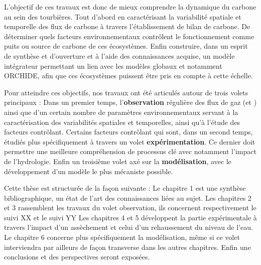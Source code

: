 \begin{linenumbers}

L'objectif de ces travaux est donc de mieux comprendre la dynamique du carbone au sein des tourbières.
Tout d'abord en caractérisant la variabilité spatiale et temporelle des flux de carbone à travers l'établissement de bilan de carbone.
De déterminer quels facteurs environnementaux contrôlent le fonctionnement comme puits ou source de carbone de ces écosystèmes.
Enfin construire, dans un esprit de synthèse et d'ouverture et à l'aide des connaissances acquise, un modèle intégrateur permettant un lien avec les modèles globaux et notamment ORCHIDE, afin que ces écosystèmes puissent être pris en compte à cette échelle.

Pour atteindre ces objectifs, nos travaux ont été articulés autour de trois volets  principaux :
Dans un premier temps, l'\textbf{observation} régulière des flux de gaz (\COO et \CHH) ainsi que d'un certain nombre de paramètres environnementaux servant à la caractérisation des variabilités spatiales et temporelles, ainsi qu'à l'étude des facteurs contrôlant.
Certains facteurs contrôlant qui sont, dans un second temps, étudiés plus spécifiquement à travers un volet \textbf{expérimentation}.
Ce dernier doit permettre une meilleure compréhension de processus clé avec notamment l'impact de l'hydrologie.
Enfin un troisième volet axé sur la \textbf{modélisation}, avec le développement d'un modèle le plus mécaniste possible.


Cette thèse est structurée de la façon suivante :
Le chapitre 1 est une synthèse bibliographique, un état de l'art des connaissances liées au sujet.
Les chapitres 2 et 3 rassemblent les travaux du volet observation, ils concernent respectivement le suivi XX et le suivi YY 
Les chapitres 4 et 5 développent la partie expérimentale à travers l'impact d'un assèchement et celui d'un rehaussement du niveau de l'eau.
Le chapitre 6 concerne plus spécifiquement la modélisation, même si ce volet interviendra par ailleurs de façon transverse dans les autres chapitres.
Enfin une conclusions et des perspectives seront exposées.

\end{linenumbers}

%
